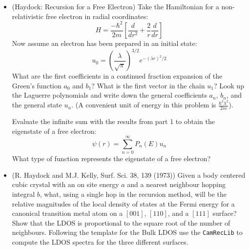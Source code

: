 \begin{itemize}
\item (Haydock: Recursion for a Free Electron) Take the Hamiltonian for a non-relativistic 
free electron in radial coordinates:
%
\begin{equation}
H = \frac{-\hbar^{2}}{2m}\left[\frac{d}{dr^{2}}+ \frac{2}{r}\frac{d}{dr}\right]
\end{equation}
%
Now assume an electron has been prepared in an initial state:
%
\begin{equation}
u_{0}=(\frac{\lambda}{\sqrt{\pi}})^{3/2} e^{-(\lambda r)^{2}/2}
\end{equation}
%
What are the first coefficients in a continued fraction expansion of the Green's
function $a_{0}$ and $b_{1}$? What is the first vector in the chain $u_{1}$?
Look up the Laguerre polynomials and write down the general 
coefficients $a_{n}$, $b_n$, and the general state $u_{n}$. 
(A convenient unit of energy in this problem is $\frac{\hbar^{2}\lambda^{2}}{2m}$).

Evaluate the infinite sum with the results from part 1 to obtain the eigenstate
of a free electron:
%
\begin{equation}
\psi(r) = \sum_{n=0}^{\infty}P_{n}(E)u_{n}
\end{equation}
%
What type of function represents the eigenstate of a free electron?

\item (R. Haydock and M.J. Kelly, Surf. Sci. 38, 139 (1973)) 
       Given a body centered cubic crystal with an 
       on site energy $a$ and a nearest neighbour hopping integral
       $b$, what, using a single hop in the recursion method, will be the relative 
       magnitudes of the local density of states 
       at the Fermi energy for a canonical transition metal 
       atom on a $[001]$, $[110]$, and a $[111]$ surface?
       Show that the LDOS is proportional to the square root of the number of neighbours.
       Following the template for the Bulk LDOS use the \texttt{CamRecLib} to compute
       the LDOS spectra for the three different surfaces.

\end{itemize}
